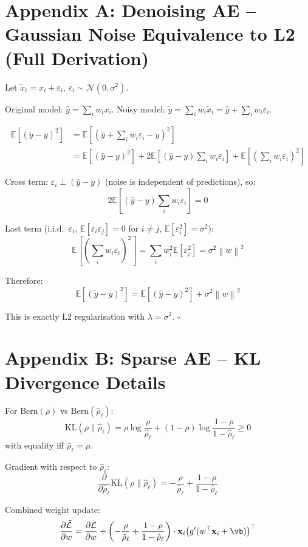 \documentclass[12pt,a4paper]{article}
\newcommand{\E}{\mathbb{E}}
\newcommand{\norm}[1]{\left\|#1\right\|}
\newcommand{\vx}{\mathbf{x}}
\newcommand{\Loss}{\mathcal{L}}
\begin{document}
\section{Appendix A: Denoising AE -- Gaussian Noise Equivalence to L2 (Full Derivation)}

\begin{thmbox}[title={Full Derivation: Noise Inputs = L2 Regularisation}]
Let $\tilde{x}_i = x_i + \varepsilon_i$, $\varepsilon_i \sim \mathcal{N}(0, \sigma^2)$.

Original model: $\hat{y} = \sum_i w_i x_i$.
Noisy model: $\tilde{y} = \sum_i w_i\tilde{x}_i = \hat{y} + \sum_i w_i\varepsilon_i$.

\begin{align*}
\E[(\tilde{y}-y)^2]
&= \E\!\left[(\hat{y} + \sum_i w_i\varepsilon_i - y)^2\right]\\
&= \E[(\hat{y}-y)^2]
  + 2\E\!\left[(\hat{y}-y)\sum_i w_i\varepsilon_i\right]
  + \E\!\left[\left(\sum_i w_i\varepsilon_i\right)^2\right]
\end{align*}

Cross term: $\varepsilon_i \perp (\hat{y}-y)$ (noise is independent of predictions), so:
\[
2\E\!\left[(\hat{y}-y)\sum_i w_i\varepsilon_i\right] = 0
\]

Last term (i.i.d.\ $\varepsilon_i$, $\E[\varepsilon_i\varepsilon_j] = 0$ for $i\neq j$, $\E[\varepsilon_i^2]=\sigma^2$):
\[
\E\!\left[\left(\sum_i w_i\varepsilon_i\right)^2\right]
= \sum_i w_i^2\E[\varepsilon_i^2] = \sigma^2\norm{w}^2
\]

Therefore:
\[
\E[(\tilde{y}-y)^2] = \E[(\hat{y}-y)^2] + \sigma^2\norm{w}^2
\]

This is exactly L2 regularisation with $\lambda = \sigma^2$. \hfill$\square$
\end{thmbox}

\section{Appendix B: Sparse AE -- KL Divergence Details}

\begin{thmbox}[title={KL Divergence Between Bernoulli Distributions}]
For $\mathrm{Bern}(\rho)$ vs $\mathrm{Bern}(\hat{\rho}_\ell)$:
\[
\text{KL}(\rho\|\hat{\rho}_\ell)
= \rho\log\frac{\rho}{\hat{\rho}_\ell}
  + (1-\rho)\log\frac{1-\rho}{1-\hat{\rho}_\ell}
\geq 0
\]
with equality iff $\hat{\rho}_\ell = \rho$.

Gradient with respect to $\hat{\rho}_\ell$:
\[
\frac{\partial}{\partial\hat{\rho}_\ell}\text{KL}(\rho\|\hat{\rho}_\ell)
= -\frac{\rho}{\hat{\rho}_\ell} + \frac{1-\rho}{1-\hat{\rho}_\ell}
\]

Combined weight update:
\[
\frac{\partial\tilde{\Loss}}{\partial w}
= \frac{\partial\Loss}{\partial w}
+ \left(-\frac{\rho}{\hat{\rho}_\ell} + \frac{1-\rho}{1-\hat{\rho}_\ell}\right)
  \cdot \vx_i\bigl(g'(w^\top\vx_i+\vb)\bigr)^\top
\]
\end{thmbox}
\end{document}
